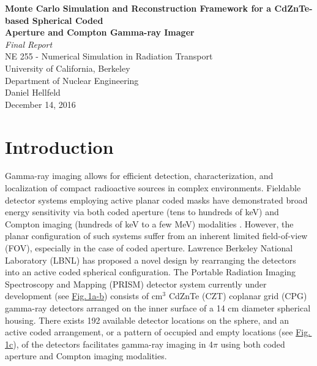 \documentclass[10pt]{article}
\begin{document}
\begin{centering}
\textbf{Monte Carlo Simulation and Reconstruction Framework for a CdZnTe-based Spherical Coded\\[-5pt] Aperture and Compton Gamma-ray Imager}\\
\vspace{5pt}
\emph{Final Report}\\
\vspace{5pt}
NE 255 - Numerical Simulation in Radiation Transport \\[-5pt]
University of California, Berkeley \\[-5pt]
Department of Nuclear Engineering\\
\vspace{5pt}
Daniel Hellfeld\\
\vspace{5pt}
December 14, 2016 \\
\end{centering}


\section{Introduction}

Gamma-ray imaging allows for efficient detection, characterization, and localization of compact radioactive sources in complex environments. Fieldable detector systems employing active planar coded masks have demonstrated broad energy sensitivity via both coded aperture (tens to hundreds of keV) and Compton imaging (hundreds of keV to a few MeV) modalities \cite{Galloway2011}. However, the planar configuration of such systems suffer from an inherent limited field-of-view (FOV), especially in the case of coded aperture. Lawrence Berkeley National Laboratory (LBNL) has proposed a novel design by rearranging the detectors into an active coded spherical configuration. The Portable Radiation Imaging Spectroscopy and Mapping (PRISM) detector system currently under development (see \hyperlink{fig1}{Fig.\,1a-b}) consists of cm$^3$ CdZnTe (CZT) coplanar grid (CPG) \cite{Luke1995} gamma-ray detectors arranged on the inner surface of a 14 cm diameter spherical housing. There exists 192 available detector locations on the sphere, and an active coded arrangement, or a pattern of occupied and empty locations (see \hyperlink{fig1}{Fig.\,1c}), of the detectors facilitates gamma-ray imaging in 4$\pi$ using both coded aperture and Compton imaging modalities.
\end{document}
